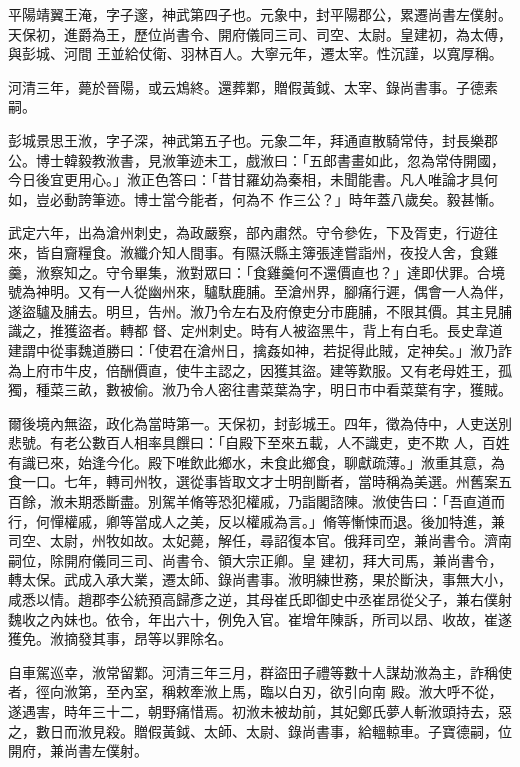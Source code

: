 \begin{pinyinscope}
 平陽靖翼王淹，字子邃，神武第四子也。元象中，封平陽郡公，累遷尚書左僕射。天保初，進爵為王，歷位尚書令、開府儀同三司、司空、太尉。皇建初，為太傅，與彭城、河間
 王並給仗衛、羽林百人。大寧元年，遷太宰。性沉謹，以寬厚稱。



 河清三年，薨於晉陽，或云鴆終。還葬鄴，贈假黃鉞、太宰、錄尚書事。子德素嗣。



 彭城景思王浟，字子深，神武第五子也。元象二年，拜通直散騎常侍，封長樂郡公。博士韓毅教浟書，見浟筆迹未工，戲浟曰：「五郎書畫如此，忽為常侍開國，今日後宜更用心。」浟正色答曰：「昔甘羅幼為秦相，未聞能書。凡人唯論才具何如，豈必動誇筆迹。博士當今能者，何為不
 作三公？」時年蓋八歲矣。毅甚慚。



 武定六年，出為滄州刺史，為政嚴察，部內肅然。守令參佐，下及胥吏，行遊往來，皆自齎糧食。浟纖介知人間事。有隰沃縣主簿張達嘗詣州，夜投人舍，食雞羹，浟察知之。守令畢集，浟對眾曰：「食雞羹何不還價直也？」達即伏罪。合境號為神明。又有一人從幽州來，驢馱鹿脯。至滄州界，腳痛行遲，偶會一人為伴，遂盜驢及脯去。明旦，告州。浟乃令左右及府僚吏分市鹿脯，不限其價。其主見脯識之，推獲盜者。轉都
 督、定州刺史。時有人被盜黑牛，背上有白毛。長史韋道建謂中從事魏道勝曰：「使君在滄州日，擒姦如神，若捉得此賊，定神矣。」浟乃詐為上府市牛皮，倍酬價直，使牛主認之，因獲其盜。建等歎服。又有老母姓王，孤獨，種菜三畝，數被偷。浟乃令人密往書菜葉為字，明日市中看菜葉有字，獲賊。



 爾後境內無盜，政化為當時第一。天保初，封彭城王。四年，徵為侍中，人吏送別悲號。有老公數百人相率具饌曰：「自殿下至來五載，人不識吏，吏不欺
 人，百姓有識已來，始逢今化。殿下唯飲此鄉水，未食此鄉食，聊獻疏薄。」浟重其意，為食一口。七年，轉司州牧，選從事皆取文才士明剖斷者，當時稱為美選。州舊案五百餘，浟未期悉斷盡。別駕羊脩等恐犯權戚，乃詣閣諮陳。浟使告曰：「吾直道而行，何憚權戚，卿等當成人之美，反以權戚為言。」脩等慚悚而退。後加特進，兼司空、太尉，州牧如故。太妃薨，解任，尋詔復本官。俄拜司空，兼尚書令。濟南嗣位，除開府儀同三司、尚書令、領大宗正卿。皇
 建初，拜大司馬，兼尚書令，轉太保。武成入承大業，遷太師、錄尚書事。浟明練世務，果於斷決，事無大小，咸悉以情。趙郡李公統預高歸彥之逆，其母崔氏即御史中丞崔昂從父子，兼右僕射魏收之內妹也。依令，年出六十，例免入官。崔增年陳訴，所司以昂、收故，崔遂獲免。浟摘發其事，昂等以罪除名。



 自車駕巡幸，浟常留鄴。河清三年三月，群盜田子禮等數十人謀劫浟為主，詐稱使者，徑向浟第，至內室，稱敕牽浟上馬，臨以白刃，欲引向南
 殿。浟大呼不從，遂遇害，時年三十二，朝野痛惜焉。初浟未被劫前，其妃鄭氏夢人斬浟頭持去，惡之，數日而浟見殺。贈假黃鉞、太師、太尉、錄尚書事，給轀輬車。子寶德嗣，位開府，兼尚書左僕射。




\end{pinyinscope}
